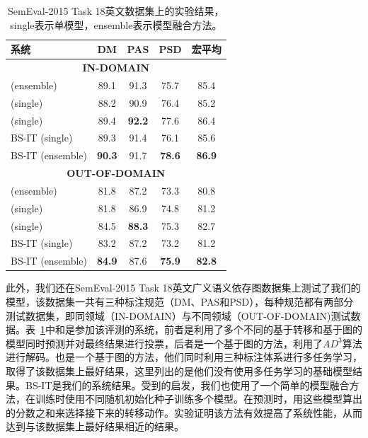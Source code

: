 \begin{table}
	\centering
	\begin{tabular}{l||ccc|c}
		\hline
		\bf 系统&\bf DM&\bf PAS&\bf PSD &\bf 宏平均\\
		\hline
		\multicolumn{5}{c}{\bf IN-DOMAIN}\\
		\hline
		\citeayu{du-EtAl:2015:SemEval} (ensemble) &89.1&91.3&75.7&85.4\\
		\citeayu{almeida-martins:2015:SemEval} (single) &88.2&90.9&76.4&85.2\\
		\citeayu{peng-thomson-smith:2017:Long} (single) &89.4&\bf 92.2&77.6&86.4\\
		\hline
		BS-IT (single) &89.3&91.4&76.1&85.6\\
		BS-IT (ensemble) &\bf 90.3& 91.7&\bf 78.6&\bf 86.9\\
		\hline
		\multicolumn{5}{c}{\bf OUT-OF-DOMAIN}\\
		\hline
		\citeayu{du-EtAl:2015:SemEval} (ensemble) &81.8&87.2&73.3&80.8\\
		\citeayu{almeida-martins:2015:SemEval} (single) &81.8&86.9&74.8&81.2\\
		\citeayu{peng-thomson-smith:2017:Long} (single) &84.5&\bf 88.3&75.3&82.7\\
		\hline
		BS-IT  (single) &83.2&87.2&73.2&81.2\\
		BS-IT (ensemble) &\bf 84.9&87.6&\bf 75.9&\bf 82.8\\
		\hline
	\end{tabular}
	\caption{SemEval-2015 Task 18英文数据集上的实验结果，single表示单模型，ensemble表示模型融合方法。}
	\label{tbl:result-semeval15}
\end{table}

此外，我们还在SemEval-2015 Task 18英文广义语义依存图数据集上测试了我们的模型，该数据集一共有三种标注规范（DM、PAS和PSD），每种规范都有两部分测试数据集，即同领域（IN-DOMAIN）与不同领域（OUT-OF-DOMAIN)测试数据。表~\ref{tbl:result-semeval15}中和是参加该评测的系统，前者是利用了多个不同的基于转移和基于图的模型同时预测并对最终结果进行投票，后者是一个基于图的方法，利用了$AD^3$算法进行解码。也是一个基于图的方法，他们同时利用三种标注体系进行多任务学习，取得了该数据集上最好结果，这里列出的是他们没有使用多任务学习的基础模型结果。BS-IT是我们的系统结果。受到的启发，我们也使用了一个简单的模型融合方法，在训练时使用不同随机初始化种子训练多个模型。在预测时，用这些模型算出的分数之和来选择接下来的转移动作。实验证明该方法有效提高了系统性能，从而达到与该数据集上最好结果相近的结果。
